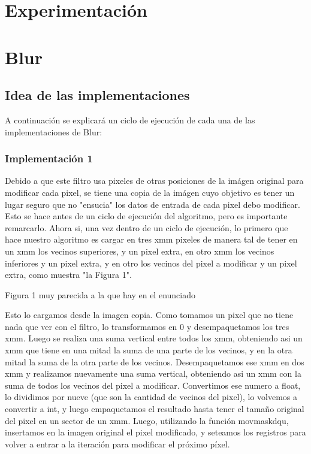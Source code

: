 \documentclass[a4paper]{article}
\begin{document}
\newpage

\section{Experimentación}


\newpage

\section{Blur}

\subsection{Idea de las implementaciones}
A continuación se explicará un ciclo de ejecución de cada una de las implementaciones de Blur:

\subsubsection{Implementación 1}

Debido a que este filtro usa pixeles de otras posiciones de la imágen original para modificar cada pixel, se tiene una copia de la imágen cuyo objetivo es tener un lugar seguro que no "ensucia" los datos de entrada de cada pixel debo modificar. Esto se hace antes de un ciclo de ejecución del algoritmo, pero es importante remarcarlo. Ahora si, una vez dentro de un ciclo de ejecución, lo primero que hace nuestro algoritmo es cargar en tres xmm pixeles de manera tal de tener en un xmm los vecinos superiores, y un pixel extra, en otro xmm los vecinos inferiores y un pixel extra, y en otro los vecinos del pixel a modificar y un pixel extra, como muestra "la Figura 1".


Figura 1 muy parecida a la que hay en el enunciado


Esto lo cargamos desde la imagen copia. Como tomamos un pixel que no tiene nada que ver con el filtro, lo transformamos en 0 y desempaquetamos los tres xmm. Luego se realiza una suma vertical entre todos los xmm, obteniendo asi un xmm que tiene en una mitad la suma de una parte de los vecinos, y en la otra mitad la suma de la otra parte de los vecinos. Desempaquetamos ese xmm en dos xmm y realizamos nuevamente una suma vertical, obteniendo asi un xmm con la suma de todos los vecinos del pixel a modificar. Convertimos ese numero a float, lo dividimos por nueve (que son la cantidad de vecinos del pixel), lo volvemos a convertir a int, y luego empaquetamos el resultado hasta tener el tamaño original del pixel en un sector de un xmm. Luego, utilizando la función movmaskdqu, insertamos en la imagen original el pixel modificado, y seteamos los registros para volver a entrar a la iteración para modificar el próximo píxel.  
\end{document}
